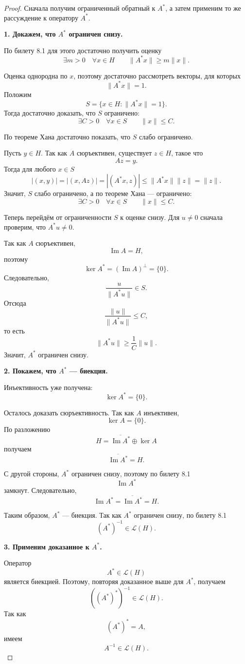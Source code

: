 \begin{proof}
	Сначала получим ограниченный обратный к \(A^*\), а затем применим то же рассуждение
	к оператору \(A^*\).
	
	\textbf{1. Докажем, что \(A^*\) ограничен снизу.}
	
	По билету 8.1 для этого достаточно получить оценку
	\[
	\exists m>0
	\quad
	\forall x\in H
	\qquad
	\|A^*x\|\geqslant m\|x\|.
	\]
	
	Оценка однородна по \(x\), поэтому достаточно рассмотреть векторы, для которых
	\[
	\|A^*x\|=1.
	\]
	Положим
	\[
	S=\{x\in H:\|A^*x\|=1\}.
	\]
	Тогда достаточно доказать, что \(S\) ограничено:
	\[
	\exists C>0
	\quad
	\forall x\in S
	\qquad
	\|x\|\leqslant C.
	\]
	
	По теореме Хана достаточно показать, что \(S\) слабо ограничено.
	
	Пусть \(y\in H\). Так как \(A\) сюръективен, существует \(z\in H\), такое что
	\[
	Az=y.
	\]
	Тогда для любого \(x\in S\)
	\[
	|(x,y)|
	=
	|(x,Az)|
	=
	|(A^*x,z)|
	\leqslant
	\|A^*x\|\|z\|
	=
	\|z\|.
	\]
	Значит, \(S\) слабо ограничено, а по теореме Хана --- ограничено:
	\[
	\exists C>0
	\quad
	\forall x\in S
	\qquad
	\|x\|\leqslant C.
	\]
	
	Теперь перейдём от ограниченности \(S\) к оценке снизу.
	Для \(u\neq0\) сначала проверим, что \(A^*u\neq0\).
	
	Так как \(A\) сюръективен,
	\[
	\operatorname{Im}A=H,
	\]
	поэтому
	\[
	\ker A^*
	=
	(\operatorname{Im}A)^\perp
	=
	\{0\}.
	\]
	Следовательно,
	\[
	\frac{u}{\|A^*u\|}\in S.
	\]
	Отсюда
	\[
	\frac{\|u\|}{\|A^*u\|}
	\leqslant C,
	\]
	то есть
	\[
	\|A^*u\|
	\geqslant
	\frac1C\|u\|.
	\]
	Значит, \(A^*\) ограничен снизу.
	
	\textbf{2. Покажем, что \(A^*\) --- биекция.}
	
	Инъективность уже получена:
	\[
	\ker A^*=\{0\}.
	\]
	
	Осталось доказать сюръективность. Так как \(A\) инъективен,
	\[
	\ker A=\{0\}.
	\]
	По разложению
	\[
	H=\overline{\operatorname{Im}A^*}\oplus\ker A
	\]
	получаем
	\[
	\overline{\operatorname{Im}A^*}=H.
	\]
	
	С другой стороны, \(A^*\) ограничен снизу, поэтому по билету 8.1
	\[
	\operatorname{Im}A^*
	\]
	замкнут. Следовательно,
	\[
	\operatorname{Im}A^*
	=
	\overline{\operatorname{Im}A^*}
	=
	H.
	\]
	
	Таким образом, \(A^*\) --- биекция. Так как \(A^*\) ограничен снизу,
	по билету 8.1
	\[
	(A^*)^{-1}\in\mathcal L(H).
	\]
	
	\textbf{3. Применим доказанное к \(A^*\).}
	
	Оператор
	\[
	A^*\in\mathcal L(H)
	\]
	является биекцией. Поэтому, повторяя доказанное выше для \(A^*\), получаем
	\[
	((A^*)^*)^{-1}\in\mathcal L(H).
	\]
	Так как
	\[
	(A^*)^*=A,
	\]
	имеем
	\[
	\boxed{A^{-1}\in\mathcal L(H)}.
	\]
\end{proof}
